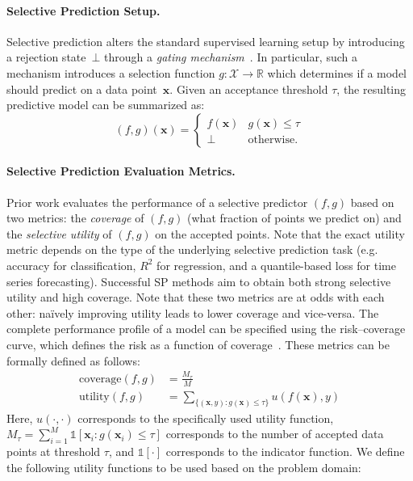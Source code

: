 \paragraph{Selective Prediction Setup.} Selective prediction alters the standard supervised learning setup by introducing a rejection state~$\bot$ through a \textit{gating mechanism}~\citep{yaniv2010riskcoveragecurve}. In particular, such a mechanism introduces a selection function $g:\mathcal{X} \rightarrow \mathbb{R}$ which determines if a model should predict on a data point~$\bm{x}$. 
Given an acceptance threshold $\tau$, the resulting predictive model can be summarized as:
\begin{equation}
    (f,g)(\bm{x}) = \begin{cases}
  f(\bm{x})  & g(\bm{x}) \leq \tau \\
  \bot & \text{otherwise.}
\end{cases}
\end{equation}

\paragraph{Selective Prediction Evaluation Metrics.} Prior work evaluates the performance of a selective predictor $(f,g)$ based on two metrics: the \emph{coverage} of $(f,g)$ (\ie what fraction of points we predict on) and the \emph{selective utility} of $(f,g)$ on the accepted points. Note that the exact utility metric depends on the type of the underlying selective prediction task (e.g. accuracy for classification, $R^2$ for regression, and a quantile-based loss for time series forecasting). Successful SP methods aim to obtain both strong selective utility and high coverage. Note that these two metrics are at odds with each other: na\"ively improving utility leads to lower coverage and vice-versa. The complete performance profile of a model can be specified using the risk–coverage curve, which defines the risk as a function of coverage~\citep{yaniv2010riskcoveragecurve}. These metrics can be formally defined as follows: 
\begin{align}
    \text{coverage}(f,g) & = \frac{M_\tau}{M} \\
    \text{utility}(f,g) & = \sum_{ \{(\bm{x}, y) : g(\bm{x}) \leq \tau \} } u(f(\bm{x}), y)
\end{align}
Here, $u(\cdot, \cdot)$ corresponds to the specifically used utility function, $M_\tau = \sum_{i=1}^M \mathds{1}[\bm{x}_i : g(\bm{x}_i) \leq \tau]$ corresponds to the number of accepted data points at threshold $\tau$, and $\mathds{1}[\cdot]$ corresponds to the indicator function. We define the following utility functions to be used based on the problem domain:

